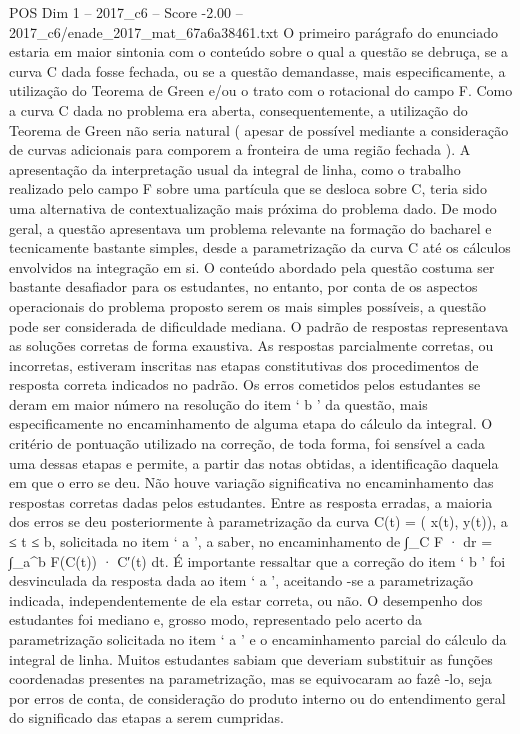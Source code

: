 \begin{textsample}{POS Dim 1 – 2017\_c6 – Score -2.00 – 2017\_c6/enade\_2017\_mat\_67a6a38461.txt}
O primeiro parágrafo do enunciado estaria em maior sintonia com o conteúdo sobre o qual a questão se debruça, se a curva C dada fosse fechada, ou se a questão demandasse, mais especificamente, a utilização do Teorema de Green e/ou o trato com o rotacional do campo F.
Como a curva C dada no problema era aberta, consequentemente, a utilização do Teorema de Green não seria natural ( apesar de possível mediante a consideração de curvas adicionais para comporem a fronteira de uma região fechada ).
A apresentação da interpretação usual da integral de linha, como o trabalho realizado pelo campo F sobre uma partícula que se desloca sobre C, teria sido uma alternativa de contextualização mais próxima do problema dado.
De modo geral, a questão apresentava um problema relevante na formação do bacharel e tecnicamente bastante simples, desde a parametrização da curva C até os cálculos envolvidos na integração em si.
O conteúdo abordado pela questão costuma ser bastante desafiador para os estudantes, no entanto, por conta de os aspectos operacionais do problema proposto serem os mais simples possíveis, a questão pode ser considerada de dificuldade mediana.
O padrão de respostas representava as soluções corretas de forma exaustiva.
As respostas parcialmente corretas, ou incorretas, estiveram inscritas nas etapas constitutivas dos procedimentos de resposta correta indicados no padrão.
Os erros cometidos pelos estudantes se deram em maior número na resolução do item ‘ b ’ da questão, mais especificamente no encaminhamento de alguma etapa do cálculo da integral.
O critério de pontuação utilizado na correção, de toda forma, foi sensível a cada uma dessas etapas e permite, a partir das notas obtidas, a identificação daquela em que o erro se deu.
Não houve variação significativa no encaminhamento das respostas corretas dadas pelos estudantes.
Entre as resposta erradas, a maioria dos erros se deu posteriormente à parametrização da curva C(t) = ( x(t), y(t)), a ≤ t ≤ b, solicitada no item ‘ a ’, a saber, no encaminhamento de ∫\_C F · dr = ∫\_a\textasciicircum{}b F(C(t)) · C′(t) dt.
É importante ressaltar que a correção do item ‘ b ’ foi desvinculada da resposta dada ao item ‘ a ’, aceitando -se a parametrização indicada, independentemente de ela estar correta, ou não.
O desempenho dos estudantes foi mediano e, grosso modo, representado pelo acerto da parametrização solicitada no item ‘ a ’ e o encaminhamento parcial do cálculo da integral de linha.
Muitos estudantes sabiam que deveriam substituir as funções coordenadas presentes na parametrização, mas se equivocaram ao fazê -lo, seja por erros de conta, de consideração do produto interno ou do entendimento geral do significado das etapas a serem cumpridas.

\end{textsample}
